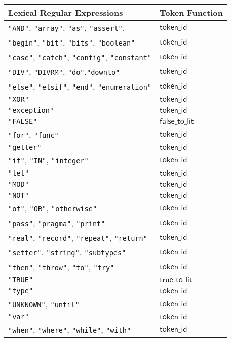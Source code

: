 \documentclass{book}
\newcommand\truetolit[0]{\textsf{true\_to\_lit}}
\newcommand\falsetolit[0]{\textsf{false\_to\_lit}}
\newcommand\tokenid[0]{\textsf{token\_id}}
\begin{document}
\begin{center}
\begin{tabular}{ll}
\textbf{Lexical Regular Expressions} & \textbf{Token Function}\\
\hline
\texttt{"AND"}, \texttt{"array"}, \texttt{"as"}, \texttt{"assert"},      & $\tokenid$ \\
\texttt{"begin"}, \texttt{"bit"}, \texttt{"bits"}, \texttt{"boolean"}       & $\tokenid$ \\
\texttt{"case"}, \texttt{"catch"}, \texttt{"config"}, \texttt{"constant"}      & $\tokenid$ \\
\texttt{"DIV"}, \texttt{"DIVRM"}, \texttt{"do"},\texttt{"downto"}        & $\tokenid$ \\
\texttt{"else"}, \texttt{"elsif"}, \texttt{"end"}, \texttt{"enumeration"}   & $\tokenid$ \\
\texttt{"XOR"}           & $\tokenid$ \\
\texttt{"exception"}     & $\tokenid$ \\
\texttt{"FALSE"} & $\falsetolit$  \\
\texttt{"for"}, \texttt{"func"}          & $\tokenid$ \\
\texttt{"getter"}        & $\tokenid$ \\
\texttt{"if"}, \texttt{"IN"}, \texttt{"integer"}       & $\tokenid$ \\
\texttt{"let"}           & $\tokenid$ \\
\texttt{"MOD"}           & $\tokenid$ \\
\texttt{"NOT"}           & $\tokenid$ \\
\texttt{"of"},      \texttt{"OR"},      \texttt{"otherwise"}                  & $\tokenid$ \\
\texttt{"pass"},    \texttt{"pragma"},  \texttt{"print"}                      & $\tokenid$ \\
\texttt{"real"},    \texttt{"record"},  \texttt{"repeat"}, \texttt{"return"}  & $\tokenid$ \\
\texttt{"setter"},  \texttt{"string"},  \texttt{"subtypes"}                   & $\tokenid$ \\
\texttt{"then"},    \texttt{"throw"},   \texttt{"to"}, \texttt{"try"}         & $\tokenid$ \\
\texttt{"TRUE"}          & $\truetolit$ \\
\texttt{"type"}          & $\tokenid$ \\
\texttt{"UNKNOWN"}, \texttt{"until"}         & $\tokenid$ \\
\texttt{"var"}           & $\tokenid$ \\
\texttt{"when"}, \texttt{"where"}, \texttt{"while"}, \texttt{"with"}          & $\tokenid$ \\
\hline
\end{tabular}
\end{center}
\end{document}
